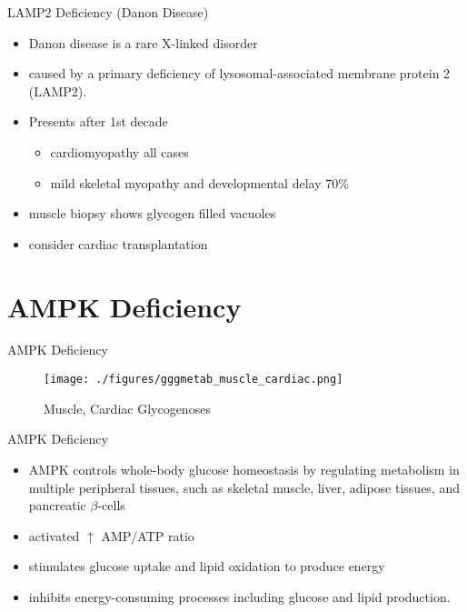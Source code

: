 \documentclass[presentation, smaller]{beamer}
\begin{document}
\begin{frame}[label={sec:orga0b7c24}]{LAMP2 Deficiency (Danon Disease)}
\begin{itemize}
\item Danon disease is a rare X-linked disorder
\item caused by a primary deficiency of lysosomal-associated membrane
protein 2 (LAMP2).
\item Presents after 1st decade
\begin{itemize}
\item cardiomyopathy all cases
\item mild skeletal myopathy and developmental delay 70\%
\end{itemize}
\item muscle biopsy shows glycogen filled vacuoles
\item consider cardiac transplantation
\end{itemize}
\end{frame}

\section{AMPK Deficiency}
\label{sec:orgc6389c7}
\begin{frame}[label={sec:orgc4bec61}]{AMPK Deficiency}
\begin{figure}[htbp]
\centering
\texttt{[image: ./figures/gggmetab\_muscle\_cardiac.png]}
\caption[Muscle, Cardiac Glycogenoses]{\label{fig:org9ceaaa7}
Muscle, Cardiac Glycogenoses}
\end{figure}
\end{frame}

\begin{frame}[label={sec:org93bd22e}]{AMPK Deficiency}
\begin{itemize}
\item AMPK controls whole-body glucose homeostasis by regulating metabolism in multiple peripheral tissues, such as
skeletal muscle, liver, adipose tissues, and pancreatic \(\beta\)-cells
\item activated \(\uparrow\) AMP/ATP ratio
\item stimulates glucose uptake and lipid oxidation to produce energy
\item inhibits energy-consuming processes including glucose and lipid production.
\end{itemize}
\end{frame}
\end{document}
